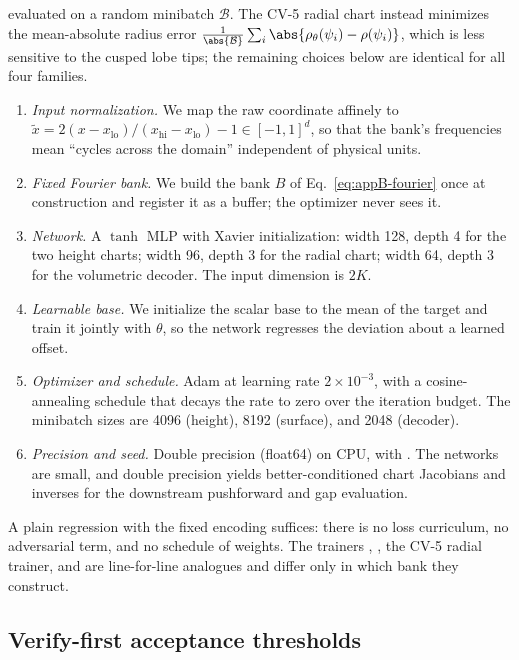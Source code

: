 evaluated on a random minibatch $\mathcal B$. The CV-5 radial chart instead minimizes the mean-absolute radius error $\frac{1}{\abs{\mathcal B}}\sum_i\abs{\rho_\theta(\psi_i)-\rho(\psi_i)}$, which is less sensitive to the cusped lobe tips; the remaining choices below are identical for all four families.

\begin{enumerate}
\item \emph{Input normalization.} We map the raw coordinate affinely to $\tilde x=2(x-x_{\mathrm{lo}})/(x_{\mathrm{hi}}-x_{\mathrm{lo}})-1\in[-1,1]^d$, so that the bank's frequencies mean ``cycles across the domain'' independent of physical units.
\item \emph{Fixed Fourier bank.} We build the bank $B$ of Eq.~\eqref{eq:appB-fourier} once at construction and register it as a buffer; the optimizer never sees it.
\item \emph{Network.} A $\tanh$ MLP with Xavier initialization: width 128, depth 4 for the two height charts; width 96, depth 3 for the radial chart; width 64, depth 3 for the volumetric decoder. The input dimension is $2K$.
\item \emph{Learnable base.} We initialize the scalar $\mathrm{base}$ to the mean of the target and train it jointly with $\theta$, so the network regresses the deviation about a learned offset.
\item \emph{Optimizer and schedule.} Adam at learning rate $2\times10^{-3}$, with a cosine-annealing schedule that decays the rate to zero over the iteration budget. The minibatch sizes are 4096 (height), 8192 (surface), and 2048 (decoder).
\item \emph{Precision and seed.} Double precision (float64) on CPU, with . The networks are small, and double precision yields better-conditioned chart Jacobians and inverses for the downstream pushforward and gap evaluation.
\end{enumerate}

A plain regression with the fixed encoding suffices: there is no loss curriculum, no adversarial term, and no schedule of weights. The trainers , , the CV-5 radial trainer, and  are line-for-line analogues and differ only in which bank they construct.

\subsection{Verify-first acceptance thresholds}\label{app:training:verify}

